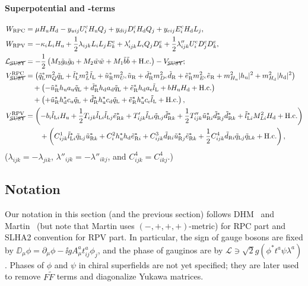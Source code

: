 \documentclass[CheatSheet]{subfiles}
\begin{document}
\paragraph{Superpotential and -terms}
\begin{align}
 W\w{RPC} &= \mu\Hu\Hd
           - \yu[ij] U^\cc_i\Hu Q_j
           + \yd[ij] D^\cc_i\Hd Q_j
           + \ye[ij] E^\cc_i\Hd L_j,\\
 W\w{RPV} &= -\kappa_i L_i\Hu
           + \frac12 \lambda  _{ijk} L_i L_j E^\cc_k
           +         \lambda' _{ijk} L_i Q_j D^\cc_k
           + \frac12 \lambda''_{ijk} U^\cc_i D^\cc_j D^\cc_k,
\\
\mathcal L_{\text{\cancel{SUSY}}}&=
- \frac12\left(M_3\tig_0\tig_0+M_2\tiw\tiw+M_1\tib\tib+\text{H.c.}\right)
-V_{\text{\cancel{SUSY}}};\\
V^{\mathrm{RPC}}_{\text{\cancel{SUSY}}}&=
\left(\tqL^*m_Q^2\tqL+\tlL^*m_L^2\tlL+\tuR^* m_{U^\cc}^2\tuR + \tdR^* m_{D^\cc}^2\tdR + \teR^* m_{E^\cc}^2\teR
       +m^2_{\Hu}|\hu|^2 + m^2_{\Hd}|\hd|^2\right)
\notag\\&\quad
       +\left(-\tuR^*\hu {a\w u}\tqL + \tdR^* \hd {a\w d} \tqL+ \teR^* \hd {a\w e} \tlL + b\Hu\Hd+\text{H.c.}\right)
\notag\\&\quad
       +\left(+\tuR^*\hd^*{c\w u}\tqL+\tdR^* \hu^*{c\w d}\tqL+\teR^*\hu^*{c\w e}\tlL+\text{H.c.}\right),
\\
V^{\mathrm{RPV}}_{\text{\cancel{SUSY}}}&=
    \left(-b_i\tlL[i]\Hu +\frac12T_{ijk}\tlL[i]\tlL[j]\teR[k]^*+T'_{ijk}\tlL[i]\tqL[j]\tdR[k]^*
             +\frac12T''_{ijk}\tuR[i]^*\tdR[j]^*\tdR[k]^*
    +\tlL[i]^*M^2_{Li}\Hd+\text{H.c.}\right)
\notag\\&\qquad
   + \left(C^1_{ijk}\tlL[i]^*\tqL[j]\tuR[k]^* + C^2_i\hu^*\hd\teR[i]^* + C^3_{ijk}\tdR[i]\tuR[j]^*\teR[k]^*+\frac12C^4_{ijk}\tdR[i]\tqL[j]\tqL[k]+\text{H.c.}\right),
\end{align}
($\lambda_{ijk}=-\lambda_{jik}$, $\lambda''_{ijk}=-\lambda''_{ikj}$, and
$C^4_{ijk}=C^4_{ikj}$.)



\clearpage

\detailstyle



\subsection{Notation}
Our notation in this section (and the previous section)  follows DHM~\cite[PhysRept]{Dreiner:2008tw} and Martin~\cite[v7]{Martin:1997ns} (but note that Martin uses $(-,+,+,+)$-metric) for RPC part and SLHA2 convention for RPV part.
In particular, the sign of gauge bosons are fixed by $\DD_\mu\phi = \partial_\mu\phi - \ii g A_\mu^a t^a_{ij}\phi_j$, and the phase of gauginos are by $\mathcal L\ni \sqrt2 g (\phi^*t^a\psi\lambda^a)$.
Phases of $\phi$ and $\psi$ in chiral superfields are not yet specified; they are later used to remove $F\tilde F$ terms and diagonalize Yukawa matrices.
\end{document}
